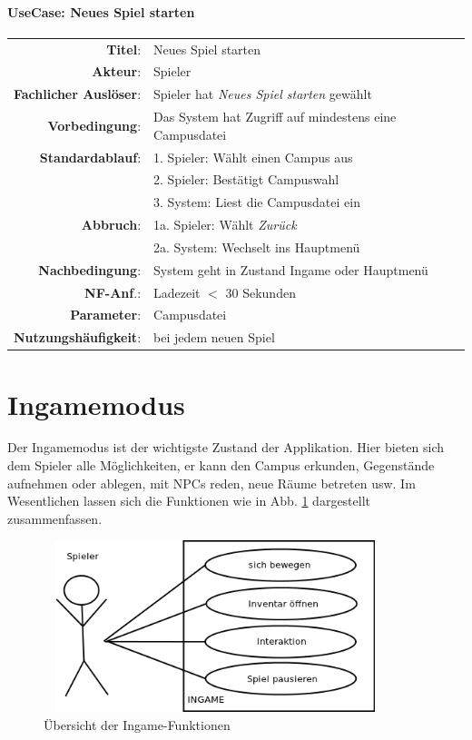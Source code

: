 \paragraph{UseCase: Neues Spiel starten}
\begin{center}
	\begin{tabular}{|r l|}
	  \hline
	  \textbf{Titel}: & Neues Spiel starten \\
	  \textbf{Akteur}: & \gls{Spieler} \\
	  \textbf{Fachlicher Auslöser}: & \gls{Spieler} hat \textit{Neues Spiel starten} gewählt \\
	  \textbf{Vorbedingung}: & Das System hat Zugriff auf mindestens eine Campusdatei \\
	  \hline
	  \textbf{Standardablauf}:
		& 1. Spieler: Wählt einen Campus aus \\
		& 2. Spieler: Bestätigt Campuswahl \\
		& 3. System: Liest die Campusdatei ein \\
	  \textbf{Abbruch}:
		& 1a. Spieler: Wählt \textit{Zurück} \\
		& 2a. System: Wechselt ins Hauptmenü \\
	  \hline
	  \textbf{Nachbedingung}: & System geht in Zustand \gls{Ingame} oder Hauptmenü \\
	  \textbf{NF-Anf}.: & Ladezeit $<$ 30 Sekunden \\
	  \textbf{Parameter}: & Campusdatei \\
	  \textbf{Nutzungshäufigkeit}: & bei jedem neuen Spiel \\
	  \hline
	\end{tabular}
\end{center}
\newpage
\section{Ingamemodus}
Der Ingamemodus ist der wichtigste Zustand der Applikation. Hier bieten sich dem Spieler alle Möglichkeiten,
er kann den Campus erkunden, Gegenstände aufnehmen oder ablegen, mit NPCs reden, neue Räume betreten usw.
Im Wesentlichen lassen sich die Funktionen wie in Abb. \ref{fig:ingame_funktionen} dargestellt zusammenfassen.

\begin{figure}[htb]
	\begin{center} 
		\includegraphics[width=100mm, height=50mm]
                  {kapitel/funktionen/InGame.png}
	\end{center}
	\caption{Übersicht der Ingame-Funktionen}
	\label{fig:ingame_funktionen}
\end{figure}

